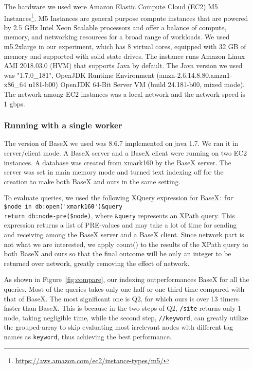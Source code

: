 The hardware we used were Amazon Elastic Compute Cloud (EC2) M5
Instances\footnote{\url{https://aws.amazon.com/ec2/instance-types/m5/}}. M5
Instances are general purpose compute instances that are powered by 2.5 GHz
Intel Xeon Scalable processors and offer a balance of compute, memory, and
networking resources for a broad range of workloads.  We used m5.2xlarge in our
experiment, which has 8 virtual cores, equipped with 32 GB of memory and
supported with solid state drives.  The instance runs Amazon Linux AMI 2018.03.0
(HVM) that supports Java by default. The Java version we used was "1.7.0\_181",
OpenJDK Runtime Environment (amzn-2.6.14.8.80.amzn1-x86\_64 u181-b00) OpenJDK
64-Bit Server VM (build 24.181-b00, mixed mode). The network among EC2 instances
was a local network and the network speed is 1 gbps.


\subsubsection{Running with a single worker}

The version of BaseX we used was 8.6.7 implemented on java 1.7. We ran it in
server/client mode. A BaseX server and a BaseX client were running on two EC2
instances. A database was created from xmark160 by the BaseX server. The server
was set in main memory mode and turned text indexing off for the creation to
make both BaseX and ours in the same setting.

To evaluate queries, we used the following XQuery expression for BaseX:  
\verb|for $node in db:open('xmark160')&query|\\
\verb|return db:node-pre($node)|, where  \verb|&query|
represents an XPath query. This expression returns a list of PRE-values and may
take a lot of time for sending and receiving among the BaseX server and a BaseX
client. Since network part is not what we are interested, we apply count() to
the results of the XPath query to both BaseX and ours so that the final outcome
will be only an integer to be returned over network, greatly removing the effect
of network.

As shown in Figure~\ref{fig:compare}, our indexing outperformances BaseX for all
the queries. Most of the queries takes only one half or one third time compared
with that of BaseX. The most significant one is Q2, for which ours is over 13
timers faster than BaseX. This is because in the two steps of Q2, \texttt{/site}
returns only 1 node, taking negligible time, while the second step,
\texttt{//keyword}, can greatly utilize the grouped-array to skip evaluating
most irrelevant nodes with different tag names as \texttt{keyword}, thus
achieving the best performance.



